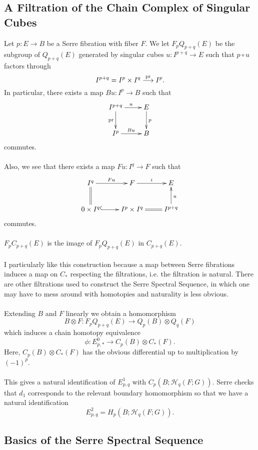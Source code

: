 \documentclass[11pt]{article}
\begin{document}
\begin{Jandr SSS notes}
	\subsection{A Filtration of the Chain Complex of Singular Cubes}
Let $p:E\to B$ be a Serre fibration with fiber $F$. We let $F_p Q_{p+q}(E)$ be the subgroup of $Q_{p+q}(E)$ generated by singular cubes $u:I^{p+q}\to E$ such that $p\circ u$ factors through
\[I^{p+q}=I^p\times I^q\overset{\textup{pr}}{\to} I^p.\]
In particular, there exists a map $Bu:I^p\to B$ such that
\[\xymatrix{I^{p+q}\ar[r]^u\ar[d]_{\textup{pr}}&E\ar[d]^p\\I^p\ar[r]^{Bu}&B}\]
commutes.\\
\\
Also, we see that there exists a map $Fu:I^q\to F$ such that
\[\xymatrix{I^q\ar[r]^{Fu}\ar@{=}[d]&F\ar[r]^i&E\\0\times I^q\ar@{^{(}->}[r]&I^p\times I^q\ar@{=}[r]&I^{p+q}\ar[u]_u}\]
commutes.\\
\\
$F_p C_{p+q}(E)$ is the image of $F_p Q_{p+q}(E)$ in $C_{p+q}(E)$.\\
\\
I particularly like this construction because a map between Serre fibrations induces a map on $C_*$ respecting the filtrations, i.e. the filtration is natural. There are other filtrations used to construct the Serre Spectral Sequence, in which one may have to mess around with homotopies and naturality is less obvious.\\
\\
Extending $B$ and $F$ linearly we obtain a homomorphism
\[B\otimes F:F_p Q_{p+q}(E)\to Q_p(B)\otimes Q_q(F)\]
which induces a chain homotopy equivalence
\[\phi:E^0_{p,*}\to C_p(B)\otimes C_*(F).\]
Here, $C_p(B)\otimes C_*(F)$ has the obvious differential up to multiplication by $(-1)^p$.\\
\\
This gives a natural identification of $E^1_{p,q}$ with $C_p(B;\mathscr{H}_q(F;G))$. Serre checks that $d_1$ corresponds to the relevant boundary homomorphism so that we have a natural identification
\[E^2_{p,q}=H_p(B;\mathscr{H}_q(F;G)).\]


	\subsection{Basics of the Serre Spectral Sequence}

\end{Jandr SSS notes}
\end{document}

